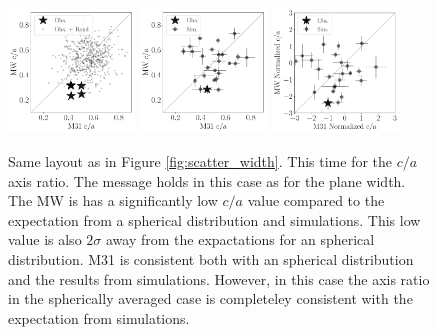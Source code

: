 \documentclass[a4paper,fleqn,usenatbib]{mnras}
\begin{document}
\begin{figure}
\centering
\includegraphics[width=0.30\textwidth]{scatter_random_ranked_ca_ratio.pdf}
\includegraphics[width=0.30\textwidth]{scatter_ranked_illudm_ca_ratio.pdf}
\includegraphics[width=0.30\textwidth]{scatter_norm_ranked_illudm_ca_ratio.pdf}
\caption{Same layout as in Figure \ref{fig:scatter_width}. 
This time for the $c/a$ axis ratio. 
The message holds in this case as for the plane width.
The MW is has a significantly low $c/a$ value compared to the
expectation from a spherical distribution and simulations. 
This low value is also $2\sigma$ away from the expactations for an
spherical distribution.
M31 is consistent both with an spherical distribution and the results
from simulations.
However, in this case the axis ratio in the spherically averaged case
is completeley consistent with the expectation from simulations.
\label{fig:scatter_ca_ratio}}
\end{figure}
\end{document}
